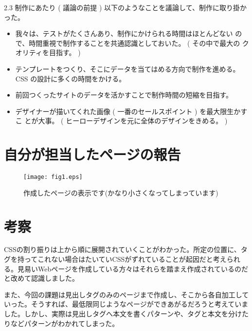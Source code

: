 2.3
制作にあたり ( 議論の前提 )\newline
以下のようなことを議論して、制作に取り掛かった。\newline
\begin{itemize}
  \item 我々は、テストがたくさんあり、制作にかけられる時間はほとんどない
ので、時間重視で制作することを共通認識としておいた。 ( その中で最大の
クオリティを目指す。 )
  \item テンプレートをつくり、そこにデータを当てはめる方向で制作を進める。\newline
 CSS の設計に多くの時間をかける。
  \item 前回つくったサイトのデータを活かすことで制作時間の短縮を目指す。
  \item デザイナーが描いてくれた画像 ( 一番のセールスポイント ) を最大限生かすこ
とが大事。 ( ヒーローデザインを元に全体のデザインをきめる。 )

\end{itemize}

\section{自分が担当したページの報告}
\begin{figure}[htbp]
\begin{center}
\texttt{[image: fig1.eps]}
\caption{作成したページの表示です(かなり小さくなってしまっています)}\label{fig1}
\end{center}
\end{figure}



\section{考察}
CSSの割り振りは上から順に展開されていくことがわかった。所定の位置に、タグを持ってこれない場合はたいていCSSがずれていることが起因だと考えられる。見易いWebページを作成している方々はそれらを踏まえ作成されているのだと改めて認識しました。\newline

また、今回の課題は見出しタグのみのページまで作成し、そこから各自加工していった。そうすれば、最低限同じようなページができあがるだろうと考えていました。しかし、実際は見出しタグへ本文を書くパターンや、タグと本文を分けたりなどパターンがわかれてしまった。\newline

